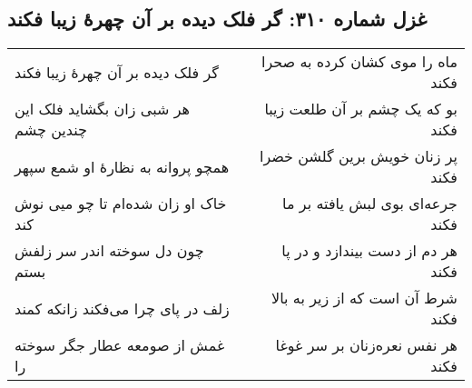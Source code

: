 \begin{center}
\section*{غزل شماره ۳۱۰: گر فلک دیده بر آن چهرهٔ زیبا فکند}
\label{sec:310}
\begin{longtable}{l p{0.5cm} r}
گر فلک دیده بر آن چهرهٔ زیبا فکند
&&
ماه را موی کشان کرده به صحرا فکند
\\
هر شبی زان بگشاید فلک این چندین چشم
&&
بو که یک چشم بر آن طلعت زیبا فکند
\\
همچو پروانه به نظارهٔ او شمع سپهر
&&
پر زنان خویش برین گلشن خضرا فکند
\\
خاک او زان شده‌ام تا چو میی نوش کند
&&
جرعه‌ای بوی لبش یافته بر ما فکند
\\
چون دل سوخته اندر سر زلفش بستم
&&
هر دم از دست بیندازد و در پا فکند
\\
زلف در پای چرا می‌فکند زانکه کمند
&&
شرط آن است که از زیر به بالا فکند
\\
غمش از صومعه عطار جگر سوخته را
&&
هر نفس نعره‌زنان بر سر غوغا فکند
\\
\end{longtable}
\end{center}
